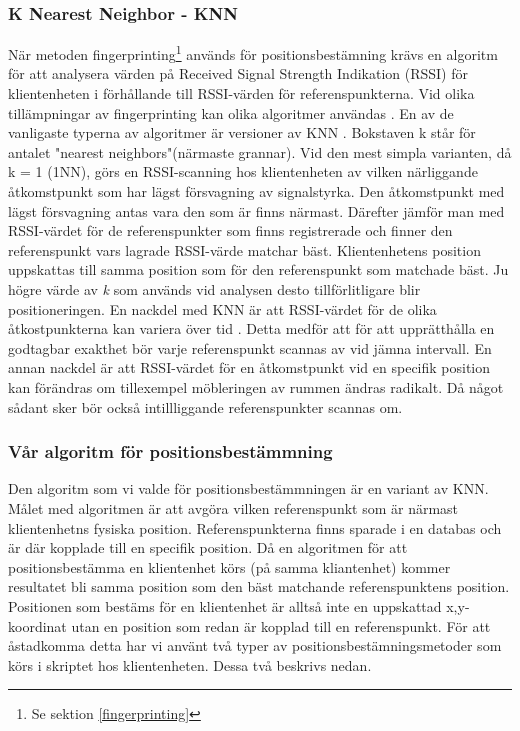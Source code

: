 \documentclass[swedish, a4paper,12pt]{article}
\begin{document}
\subsubsection{K Nearest Neighbor - KNN}
När metoden fingerprinting\footnote{Se sektion \ref{fingerprinting}} används för positionsbestämning krävs en algoritm för att analysera värden på Received Signal Strength Indikation (RSSI) för klientenheten i förhållande till RSSI-värden för referenspunkterna. Vid olika tillämpningar av fingerprinting kan olika algoritmer användas \cite{tian2013fingerprint}\cite{jun2018low}. En av de vanligaste typerna av algoritmer är versioner av KNN \cite{tian2013fingerprint}.
Bokstaven k står för antalet "nearest neighbors"(närmaste grannar). Vid den mest simpla varianten, då k = 1 (1NN), görs en RSSI-scanning hos klientenheten av vilken närliggande åtkomstpunkt som har lägst försvagning av signalstyrka. Den åtkomstpunkt med lägst försvagning antas vara den som är finns närmast. Därefter jämför man med RSSI-värdet för de referenspunkter som finns registrerade och finner den referenspunkt vars lagrade RSSI-värde matchar bäst. Klientenhetens position uppskattas till samma position som för den referenspunkt som matchade bäst.
Ju högre värde av \textit{k} som används vid analysen desto tillförlitligare blir positioneringen.
En nackdel med KNN är att RSSI-värdet för de olika åtkostpunkterna kan variera över tid \cite{tian2013fingerprint}. Detta medför att för att upprätthålla en godtagbar exakthet bör varje referenspunkt scannas av vid jämna intervall.
En annan nackdel är att RSSI-värdet för en åtkomstpunkt vid en specifik position kan förändras om tillexempel möbleringen av rummen ändras radikalt. Då något sådant sker bör också intillliggande referenspunkter scannas om.


\subsubsection{Vår algoritm för positionsbestämmning}
Den algoritm som vi valde för positionsbestämmningen är en variant av KNN.
Målet med algoritmen är att avgöra vilken referenspunkt som är närmast klientenhetns fysiska position. Referenspunkterna finns sparade i en databas och är där kopplade till en specifik position. Då en algoritmen för att positionsbestämma en klientenhet körs (på samma kliantenhet) kommer resultatet bli samma position som den bäst matchande referenspunktens position. Positionen som bestäms för en klientenhet är alltså inte en uppskattad x,y-koordinat utan en position som redan är kopplad till en referenspunkt.
För att åstadkomma detta har vi använt två typer av positionsbestämningsmetoder som körs i skriptet hos klientenheten. Dessa två beskrivs nedan.
\end{document}

